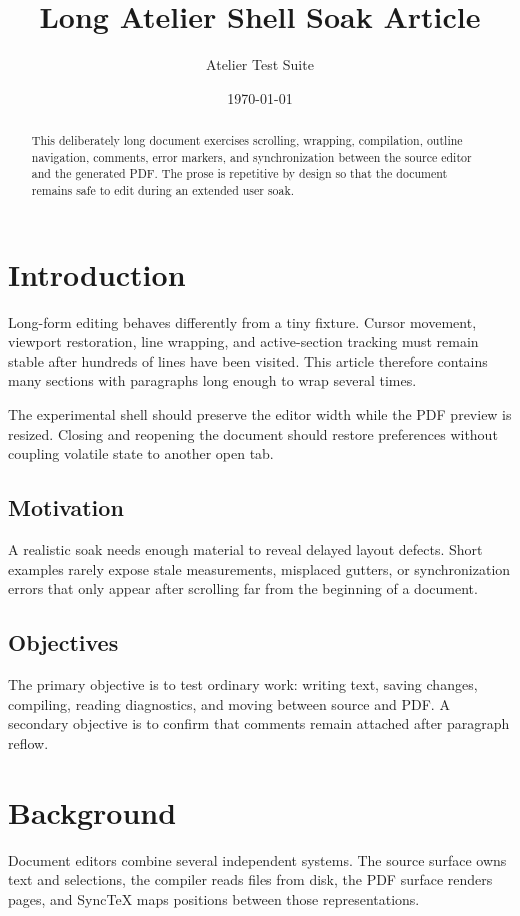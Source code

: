 \documentclass[11pt]{article}
\title{Long Atelier Shell Soak Article}
\author{Atelier Test Suite}
\date{\today}
\begin{document}
\maketitle

\begin{abstract}
This deliberately long document exercises scrolling, wrapping, compilation,
outline navigation, comments, error markers, and synchronization between the
source editor and the generated PDF. The prose is repetitive by design so that
the document remains safe to edit during an extended user soak.
\end{abstract}

\tableofcontents
\newpage

\section{Introduction}
Long-form editing behaves differently from a tiny fixture. Cursor movement,
viewport restoration, line wrapping, and active-section tracking must remain
stable after hundreds of lines have been visited. This article therefore
contains many sections with paragraphs long enough to wrap several times.

The experimental shell should preserve the editor width while the PDF preview
is resized. Closing and reopening the document should restore preferences
without coupling volatile state to another open tab.

\subsection{Motivation}
A realistic soak needs enough material to reveal delayed layout defects. Short
examples rarely expose stale measurements, misplaced gutters, or synchronization
errors that only appear after scrolling far from the beginning of a document.

\subsection{Objectives}
The primary objective is to test ordinary work: writing text, saving changes,
compiling, reading diagnostics, and moving between source and PDF. A secondary
objective is to confirm that comments remain attached after paragraph reflow.

\section{Background}
Document editors combine several independent systems. The source surface owns
text and selections, the compiler reads files from disk, the PDF surface renders
pages, and SyncTeX maps positions between those representations.
\end{document}
